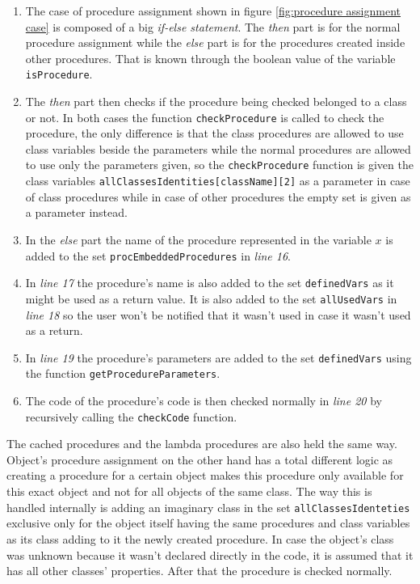 \documentclass[11pt]{report}
\begin{document}
\begin{enumerate}
\item The case of procedure assignment shown in figure \ref{fig:procedure assignment case} is composed of a big \textsl{if-else statement}. The \textsl{then} part is for the normal procedure assignment while the \textsl{else} part is for the procedures created inside other procedures. That is known through the boolean value of the variable \texttt{isProcedure}.

\item The \textsl{then} part then checks if the procedure being checked belonged to a class or not. In both cases the function \texttt{checkProcedure} is called to check the procedure, the only difference is that the class procedures are allowed to use class variables beside the parameters while the normal procedures are allowed to use only the parameters given, so the \texttt{checkProcedure} function is given the class variables \texttt{allClassesIdentities[className][2]} as a parameter in case of class procedures while in case of other procedures the empty set is given as a parameter instead.

\item In the \textsl{else} part the name of the procedure represented in the variable $x$ is added to the set \texttt{procEmbeddedProcedures} in \textsl{line 16}.

\item In \textsl{line 17} the procedure's name is also added to the set \texttt{definedVars} as it might be used as a return value. It is also added to the set \texttt{allUsedVars} in \textsl{line 18} so the user won't be notified that it wasn't used in case it wasn't used as a return.

\item In \textsl{line 19} the procedure's parameters are added to the set \texttt{definedVars} using the function \texttt{getProcedureParameters}.

\item The code of the procedure's code is then checked normally in \textsl{line 20} by recursively calling the \texttt{checkCode} function. 

\end{enumerate}

The cached procedures and the lambda procedures are also held the same way. Object's procedure assignment on the other hand has a total different logic as creating a procedure for a certain object makes this procedure only available for this exact object and not for all objects of the same class. The way this is handled internally is adding an imaginary class in the set \texttt{allClassesIdenteties} exclusive only for the object itself having the same procedures and class variables as its class adding to it the newly created procedure. In case the object's class was unknown because it wasn't declared directly in the code, it is assumed that it has all other classes' properties. After that the procedure is checked normally.
\\
\\
\end{document}
